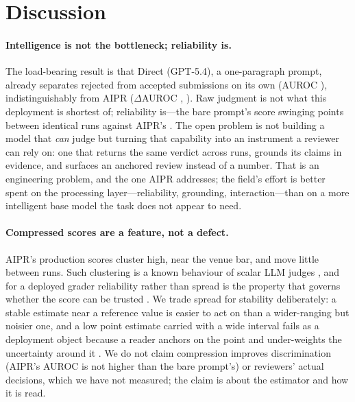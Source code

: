 \section{Discussion}
\label{sec:nmi-discussion}
\label{sec:discussion}

\paragraph{Intelligence is not the bottleneck; reliability is.}
The load-bearing result is that Direct (GPT-5.4), a one-paragraph prompt, already separates
rejected from accepted submissions on its own (AUROC \aurocNaiveFull), indistinguishably from
AIPR ($\Delta$AUROC \aurocDiffFullNaive, \aurocDiffPrel). Raw judgment is not what this
deployment is shortest of; reliability is---the bare prompt's score swinging \naiveRunSD{}
points between identical runs against AIPR's \fullRunSD{}. The open problem is not building a
model that \emph{can} judge but turning that capability into an instrument a reviewer can rely
on: one that returns the same verdict across runs, grounds its claims in evidence, and surfaces
an anchored review instead of a number. That is an engineering problem, and the one AIPR
addresses; the field's effort is better spent on the processing layer---reliability, grounding,
interaction---than on a more intelligent base model the task does not appear to need.

\paragraph{Compressed scores are a feature, not a defect.}
AIPR's production scores cluster high, near the venue bar, and move little between runs. Such
clustering is a known behaviour of scalar LLM judges \citep{girrbach2025referencefree}, and for
a deployed grader reliability rather than spread is the property that governs whether the score
can be trusted \citep{gu2024surveyllmjudge,schroeder2024trustllm}. We trade spread for stability
deliberately: a stable estimate near a reference value is easier to act on than a wider-ranging
but noisier one, and a low point estimate carried with a wide interval fails as a deployment
object because a reader anchors on the point and under-weights the uncertainty around it
\citep{hofman2020inferential}. We do not claim compression improves discrimination (AIPR's AUROC
is not higher than the bare prompt's) or reviewers' actual decisions, which we have not measured;
the claim is about the estimator and how it is read.

